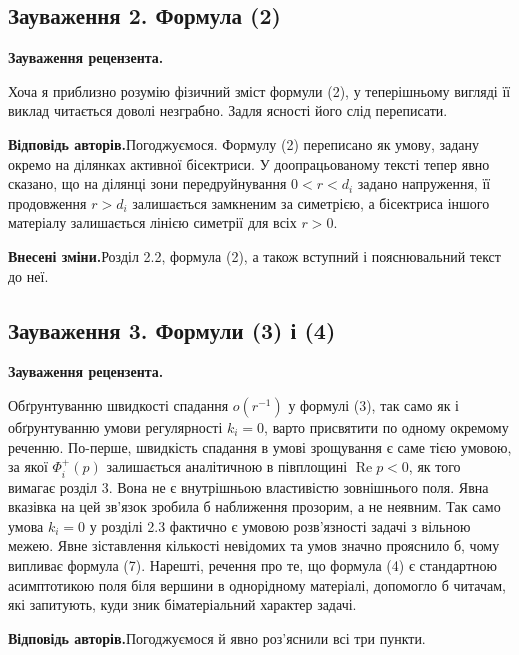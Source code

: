 \documentclass[11pt]{article}
\newcommand{\responseheading}{\textbf{Відповідь авторів.}\enspace}
\newcommand{\revisionheading}{\textbf{Внесені зміни.}\enspace}
\newenvironment{reviewcomment}{\def\FrameCommand{\textcolor{blue!45!black}{\vrule width 1.2pt}\hspace{9pt}}\MakeFramed{\advance\hsize-\width\FrameRestore}\noindent\textbf{Зауваження рецензента.}\par\smallskip\noindent}{\endMakeFramed}
\begin{document}
\subsection*{Зауваження 2. Формула (2)}

\begin{reviewcomment}
Хоча я приблизно розумію фізичний зміст формули (2), у теперішньому вигляді її виклад читається доволі незграбно. Задля ясності його слід переписати.
\end{reviewcomment}

\responseheading Погоджуємося. Формулу (2) переписано як умову, задану окремо на ділянках активної бісектриси. У доопрацьованому тексті тепер явно сказано, що на ділянці зони передруйнування \(0<r<d_i\) задано напруження, її продовження \(r>d_i\) залишається замкненим за симетрією, а бісектриса іншого матеріалу залишається лінією симетрії для всіх \(r>0\).

\revisionheading Розділ 2.2, формула (2), а також вступний і пояснювальний текст до неї.

\subsection*{Зауваження 3. Формули (3) і (4)}

\begin{reviewcomment}
Обґрунтуванню швидкості спадання \(o(r^{-1})\) у формулі (3), так само як і обґрунтуванню умови регулярності \(k_i=0\), варто присвятити по одному окремому реченню. По-перше, швидкість спадання в умові зрощування є саме тією умовою, за якої \(\Phi_i^+(p)\) залишається аналітичною в півплощині \(\operatorname{Re}p<0\), як того вимагає розділ 3. Вона не є внутрішньою властивістю зовнішнього поля. Явна вказівка на цей зв’язок зробила б наближення прозорим, а не неявним. Так само умова \(k_i=0\) у розділі 2.3 фактично є умовою розв’язності задачі з вільною межею. Явне зіставлення кількості невідомих та умов значно прояснило б, чому випливає формула (7). Нарешті, речення про те, що формула (4) є стандартною асимптотикою поля біля вершини в однорідному матеріалі, допомогло б читачам, які запитують, куди зник біматеріальний характер задачі.
\end{reviewcomment}

\responseheading Погоджуємося й явно роз’яснили всі три пункти.
\end{document}
